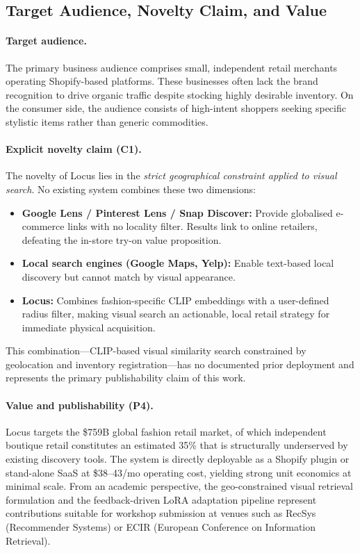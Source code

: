 \documentclass[12pt]{article}
\begin{document}
\subsection{Target Audience, Novelty Claim, and Value}
\label{sec:novelty}

\paragraph{Target audience.}
The primary business audience comprises small, independent retail merchants operating Shopify-based platforms. These businesses often lack the brand recognition to drive organic traffic despite stocking highly desirable inventory. On the consumer side, the audience consists of high-intent shoppers seeking specific stylistic items rather than generic commodities.

\paragraph{Explicit novelty claim (C1).}
The novelty of Locus lies in the \emph{strict geographical constraint applied to visual search}. No existing system combines these two dimensions:

\begin{itemize}[leftmargin=*]
  \item \textbf{Google Lens / Pinterest Lens / Snap Discover:} Provide globalised e-commerce links with no locality filter. Results link to online retailers, defeating the in-store try-on value proposition.
  \item \textbf{Local search engines (Google Maps, Yelp):} Enable text-based local discovery but cannot match by visual appearance.
  \item \textbf{Locus:} Combines fashion-specific CLIP embeddings with a user-defined radius filter, making visual search an actionable, local retail strategy for immediate physical acquisition.
\end{itemize}

This combination---CLIP-based visual similarity search constrained by geolocation and inventory registration---has no documented prior deployment and represents the primary publishability claim of this work.

\paragraph{Value and publishability (P4).}
Locus targets the \$759B global fashion retail market, of which independent boutique retail constitutes an estimated 35\% that is structurally underserved by existing discovery tools. The system is directly deployable as a Shopify plugin or stand-alone SaaS at \$38--43/mo operating cost, yielding strong unit economics at minimal scale. From an academic perspective, the geo-constrained visual retrieval formulation and the feedback-driven LoRA adaptation pipeline represent contributions suitable for workshop submission at venues such as RecSys (Recommender Systems) or ECIR (European Conference on Information Retrieval).
\end{document}
